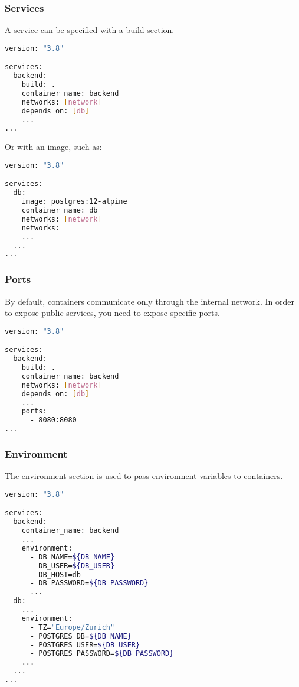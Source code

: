 \documentclass{article}
\begin{document}
\subsubsection{Services}
A service can be specified with a build section. \\

\begin{lstlisting}[language=bash,breaklines=true,label={code:compose}]
version: "3.8"

services:
  backend:
    build: .
    container_name: backend
    networks: [network]
    depends_on: [db]
    ...
...
\end{lstlisting}
\vspace{.4cm}
Or with an image, such as: \\

\begin{lstlisting}[language=bash,breaklines=true,label={code:compose}]
version: "3.8"

services:
  db:
    image: postgres:12-alpine
    container_name: db
    networks: [network]
    networks:
    ...
  ...
...
\end{lstlisting}

\subsubsection{Ports}
By default, containers communicate only through the internal network. In order to expose public services, you need to expose specific ports. \\

\begin{lstlisting}[language=bash,breaklines=true,label={code:compose}]
version: "3.8"

services:
  backend:
    build: .
    container_name: backend
    networks: [network]
    depends_on: [db]
    ...
    ports:
      - 8080:8080
...
\end{lstlisting}

\subsubsection{Environment}
The environment section is used to pass environment variables to containers. \\

\begin{lstlisting}[language=bash,breaklines=true,label={code:compose}]
version: "3.8"

services:
  backend:
    container_name: backend
    ...
    environment:
      - DB_NAME=${DB_NAME}
      - DB_USER=${DB_USER}
      - DB_HOST=db
      - DB_PASSWORD=${DB_PASSWORD}
      ...
  db:
    ...
    environment:
      - TZ="Europe/Zurich"
      - POSTGRES_DB=${DB_NAME}
      - POSTGRES_USER=${DB_USER}
      - POSTGRES_PASSWORD=${DB_PASSWORD}
    ...
  ...
...
\end{lstlisting}
\end{document}
